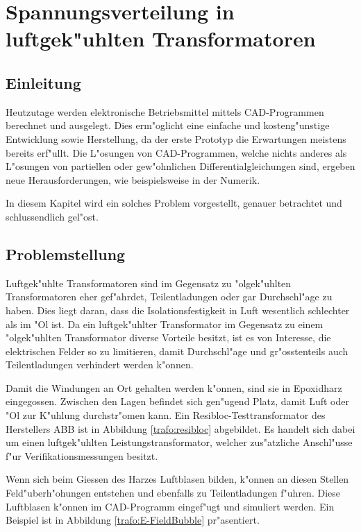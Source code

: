 \chapter{Spannungsverteilung in luftgek"uhlten Transformatoren\label{chapter:thema}}
\begin{refsection}

\section{Einleitung}

Heutzutage werden elektronische Betriebsmittel mittels CAD-Programmen berechnet und ausgelegt. Dies erm"oglicht eine einfache und kosteng"unstige Entwicklung sowie Herstellung, da der erste Prototyp die Erwartungen meistens bereits erf"ullt. Die L"osungen von CAD-Programmen, welche nichts anderes als L"osungen von partiellen oder gew"ohnlichen Differentialgleichungen sind, ergeben neue Herausforderungen, wie beispielsweise in der Numerik. 

In diesem Kapitel wird ein solches Problem vorgestellt, genauer betrachtet und schlussendlich gel"ost.

\section{Problemstellung}

Luftgek"uhlte Transformatoren sind im Gegensatz zu "olgek"uhlten Transformatoren eher gef"ahrdet, Teilentladungen oder gar Durchschl"age zu haben. Dies liegt daran, dass die Isolationsfestigkeit in Luft wesentlich schlechter als im "Ol ist. Da ein luftgek"uhlter Transformator im Gegensatz zu einem "olgek"uhlten Transformator diverse Vorteile besitzt, ist es von Interesse, die elektrischen Felder so zu limitieren, damit Durchschl"age und gr"osstenteils auch Teilentladungen verhindert werden k"onnen. 

Damit die Windungen an Ort gehalten werden k"onnen, sind sie in Epoxidharz eingegossen. Zwischen den Lagen befindet sich gen"ugend Platz, damit Luft oder "Ol zur K"uhlung durchstr"omen kann. Ein Resibloc-Testtransformator des Herstellers ABB ist in Abbildung \ref{trafo:resibloc} abgebildet. Es handelt sich dabei um einen luftgek"uhlten Leistungstransformator, welcher zus"atzliche Anschl"usse f"ur Verifikationsmessungen besitzt. 

Wenn sich beim Giessen des Harzes Luftblasen bilden, k"onnen an diesen Stellen Feld"uberh"ohungen entstehen und ebenfalls zu Teilentladungen f"uhren. Diese Luftblasen k"onnen im CAD-Programm eingef"ugt und simuliert werden. Ein Beispiel ist in Abbildung \ref{trafo:E-FieldBubble} pr"asentiert.


\end{refsection}
